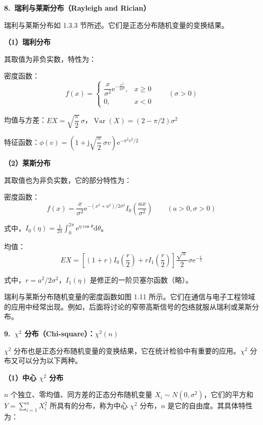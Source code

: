 \documentclass[11pt,openany,UTF8]{ctexbook}
\newcommand{\dif}{\mathrm{d}}                      %
\newcommand{\eu}{\mathrm{e}}                       %
\newcommand{\ju}{\mathrm{j}}                       %
\DeclareMathOperator{\Var}{Var}                    %
\newcommand{\bhead}[1]{\par\medskip\noindent\textbf{#1}\par\smallskip}
\begin{document}
\bhead{8.\ 瑞利与莱斯分布（Rayleigh and Rician\nobreak）}
\noindent
瑞利与莱斯分布如 1.3.3 节所述\nobreak。它们是正态分布随机变量的变换结果\nobreak。

\noindent\textbf{（1\nobreak）瑞利分布}

\noindent
其取值为非负实数\nobreak，特性为\nobreak：

密度函数\nobreak：
\[
f(x)=\begin{cases}
\dfrac{x}{\sigma^2}\eu^{-\frac{x^2}{2\sigma^2}}, & x\geqslant 0\\[6pt]
0, & x<0
\end{cases}
\qquad(\sigma>0)
\]

均值与方差\nobreak：\quad $EX=\sqrt{\dfrac{\pi}{2}}\,\sigma$\nobreak，\quad $\Var(X)=(2-\pi/2)\sigma^2$

特征函数\nobreak：\quad $\phi(v)=\left(1+\ju\sqrt{\dfrac{\pi}{2}}\,\sigma v\right)\eu^{-\sigma^2v^2/2}$

\noindent\textbf{（2\nobreak）莱斯分布}

\noindent
其取值也为非负实数\nobreak，它的部分特性为\nobreak：

密度函数\nobreak：
\[
f(x)=\frac{x}{\sigma^2}\eu^{-(x^2+a^2)/2\sigma^2}I_0\left(\frac{ax}{\sigma^2}\right)\qquad(a>0,\sigma>0)
\]

式中\nobreak，$\displaystyle I_0(\eta)=\frac{1}{2\pi}\int_{0}^{2\pi}\eu^{\eta\cos\theta}\dif\theta$\nobreak。

均值\nobreak：
\[
EX=\left[(1+r)I_0\left(\frac{r}{2}\right)+rI_1\left(\frac{r}{2}\right)\right]\frac{\sqrt{\pi}}{2}\sigma\eu^{-\frac{r}{2}}
\]

式中\nobreak，$r=a^2/2\sigma^2$\nobreak，$I_1(\eta)$ 是修正的一阶贝塞尔函数（略\nobreak）\nobreak。

瑞利与莱斯分布随机变量的密度函数如图 1.11 所示\nobreak。它们在通信与电子工程领域的应用中经常出现\nobreak。例如\nobreak，后面将讨论的窄带高斯信号的包络就服从瑞利或莱斯分布\nobreak。

\bhead{9.\ $\chi^2$ 分布（Chi-square\nobreak）\nobreak：$\chi^2(n)$}
\noindent
$\chi^2$ 分布也是正态分布随机变量的变换结果\nobreak，它在统计检验中有重要的应用\nobreak。$\chi^2$ 分布又可以分为以下两种\nobreak。

\noindent\textbf{（1\nobreak）中心 $\chi^2$ 分布}

\noindent
$n$ 个独立\nobreak、零均值\nobreak、同方差的正态分布随机变量 $X_i\sim N(0,\sigma^2)$\nobreak，它们的平方和 $\displaystyle Y=\sum_{i=1}^{n}X_i^2$ 所具有的分布\nobreak，称为中心 $\chi^2$ 分布\nobreak，$n$ 是它的自由度\nobreak。其具体特性为\nobreak：
\end{document}

